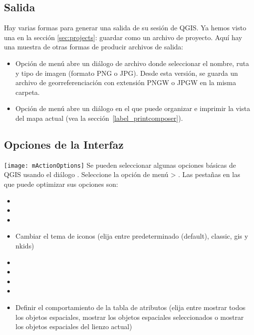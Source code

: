 \subsection{Salida}\label{sec:output}
Hay varias formas para generar una salida de su sesión de QGIS.
Ya hemos visto una en la sección \ref{sec:projects}: guardar como un archivo de proyecto. 
Aquí hay una muestra de otras formas de producir archivos de salida:
\begin{itemize}
\item Opción de menú  abre un
diálogo de archivo donde seleccionar el nombre, ruta y tipo de imagen (formato PNG o JPG). Desde esta
versión, se guarda un archivo de georreferenciación con extensión PNGW o JPGW en la misma carpeta.
\item Opción de menú  abre un
diálogo en el que puede organizar e imprimir la vista del mapa actual (vea la
sección~\ref{label_printcomposer}).
\end{itemize}


\subsection{Opciones de la Interfaz}
\label{subsec:gui_options}
\texttt{[image: mActionOptions]} 
Se pueden seleccionar algunas opciones básicas de QGIS usando el diálogo .
Seleccione la opción de menú  >
 . Las pestañas en las que puede optimizar
sus opciones son:


\begin{itemize}
\item {}
\item {}
\item {}
\item Cambiar el tema de iconos (elija entre predeterminado (default), classic, gis y nkids)
\item {}
\item {}
\item {}
\item {}
\item Definir el comportamiento de la tabla de atributos (elija entre mostrar todos los
objetos espaciales, mostrar los objetos espaciales seleccionados o mostrar los objetos
espaciales del lienzo actual)
\end{itemize}

